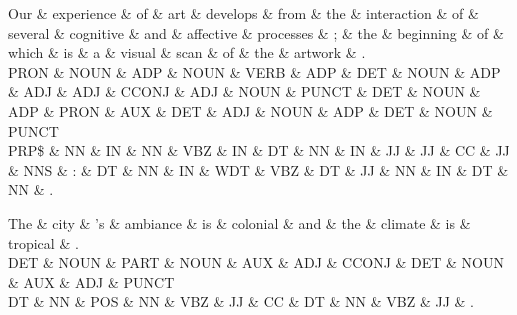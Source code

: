 
\begin{dependency}
\begin{deptext}
Our \& experience \& of \& art \& develops \& from \& the \& interaction \& of \& several \& cognitive \& and \& affective \& processes \& ; \& the \& beginning \& of \& which \& is \& a \& visual \& scan \& of \& the \& artwork \& . \\
PRON \& NOUN \& ADP \& NOUN \& VERB \& ADP \& DET \& NOUN \& ADP \& ADJ \& ADJ \& CCONJ \& ADJ \& NOUN \& PUNCT \& DET \& NOUN \& ADP \& PRON \& AUX \& DET \& ADJ \& NOUN \& ADP \& DET \& NOUN \& PUNCT \\
PRP\$ \& NN \& IN \& NN \& VBZ \& IN \& DT \& NN \& IN \& JJ \& JJ \& CC \& JJ \& NNS \& : \& DT \& NN \& IN \& WDT \& VBZ \& DT \& JJ \& NN \& IN \& DT \& NN \& . \\
\end{deptext}  



\end{dependency}

\begin{dependency}
\begin{deptext}
The \& city \& 's \& ambiance \& is \& colonial \& and \& the \& climate \& is \& tropical \& . \\
DET \& NOUN \& PART \& NOUN \& AUX \& ADJ \& CCONJ \& DET \& NOUN \& AUX \& ADJ \& PUNCT \\
DT \& NN \& POS \& NN \& VBZ \& JJ \& CC \& DT \& NN \& VBZ \& JJ \& . \\
\end{deptext}



\end{dependency}

